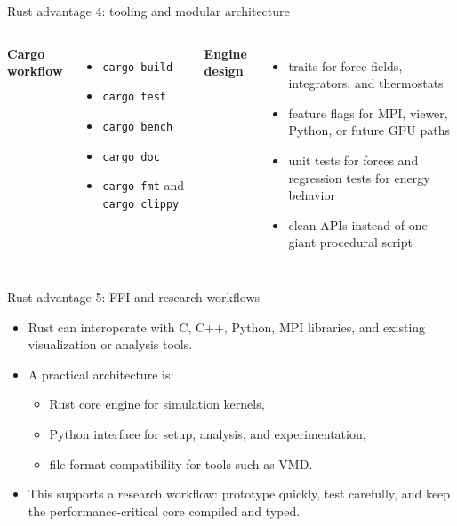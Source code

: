 \documentclass[aspectratio=169]{beamer}
\begin{document}
\begin{frame}{Rust advantage 4: tooling and modular architecture}
\begin{columns}[T]
\textbf{Cargo workflow}
\begin{itemize}
  \item \texttt{cargo build}
  \item \texttt{cargo test}
  \item \texttt{cargo bench}
  \item \texttt{cargo doc}
  \item \texttt{cargo fmt} and \texttt{cargo clippy}
\end{itemize}

\textbf{Engine design}
\begin{itemize}
  \item traits for force fields, integrators, and thermostats
  \item feature flags for MPI, viewer, Python, or future GPU paths
  \item unit tests for forces and regression tests for energy behavior
  \item clean APIs instead of one giant procedural script
\end{itemize}
\end{columns}
\end{frame}

\begin{frame}{Rust advantage 5: FFI and research workflows}
\begin{itemize}
  \item Rust can interoperate with C, C++, Python, MPI libraries, and existing visualization or analysis tools.
  \item A practical architecture is:
  \begin{itemize}
    \item Rust core engine for simulation kernels,
    \item Python interface for setup, analysis, and experimentation,
    \item file-format compatibility for tools such as VMD.
  \end{itemize}
  \item This supports a research workflow: prototype quickly, test carefully, and keep the performance-critical core compiled and typed.
\end{itemize}
\end{frame}
\end{document}
